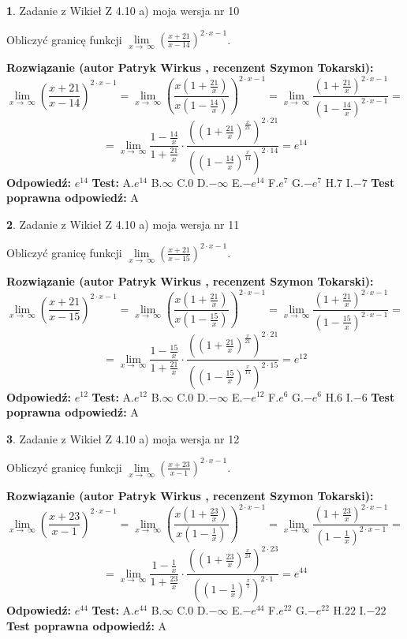\documentclass[12pt, a4paper]{article}
\theoremstyle{definition} %
\newtheorem{zad}{}
\newcommand{\zadStart}[1]{\begin{zad}#1\newline}
\newcommand{\zadStop}{\end{zad}}
\newcommand{\rozwStart}[2]{\noindent \textbf{Rozwiązanie (autor #1 , recenzent #2): }\newline}
\newcommand{\rozwStop}{\newline}
\newcommand{\odpStart}{\noindent \textbf{Odpowiedź:}\newline}
\newcommand{\odpStop}{\newline}
\newcommand{\testStart}{\noindent \textbf{Test:}\newline}
\newcommand{\testStop}{\newline}
\newcommand{\kluczStart}{\noindent \textbf{Test poprawna odpowiedź:}\newline}
\newcommand{\kluczStop}{\newline}
\begin{document}
\zadStart{Zadanie z Wikieł Z 4.10 a) moja wersja nr 10}

Obliczyć granicę funkcji  $\lim\limits_{x\to\ \infty}(\frac{x+21}{x-14})^{2\cdot x-1}$.
\zadStop
\rozwStart{Patryk Wirkus}{Szymon Tokarski}
$$\lim\limits_{x\to\ \infty}(\frac{x+21}{x-14})^{2\cdot x-1} = \lim\limits_{x\to\ \infty}(\frac{x(1+\frac{21}{x})}{x(1-\frac{14}{x})})^{2\cdot x-1}=\lim\limits_{x\to\ \infty}\frac{(1+\frac{21}{x})^{2\cdot x-1}}{(1-\frac{14}{x})^{2\cdot x-1}}=$$
$$=\lim\limits_{x\to\ \infty}\frac{1-\frac{14}{x}}{1+\frac{21}{x}}\cdot\frac{((1+\frac{21}{x})^{\frac{x}{21}})^{2\cdot21}}{((1-\frac{14}{x})^{\frac{x}{14}})^{2\cdot14}}=e^{14}$$
\rozwStop
\odpStart
$e^{14}$
\odpStop
\testStart
A.$e^{14}$ B.$\infty$ C.$0$ D.$-\infty$ E.$-e^{14}$
F.$e^{7}$ G.$-e^{7}$
H.$7$
I.$-7$
\testStop
\kluczStart
A
\kluczStop



\zadStart{Zadanie z Wikieł Z 4.10 a) moja wersja nr 11}

Obliczyć granicę funkcji  $\lim\limits_{x\to\ \infty}(\frac{x+21}{x-15})^{2\cdot x-1}$.
\zadStop
\rozwStart{Patryk Wirkus}{Szymon Tokarski}
$$\lim\limits_{x\to\ \infty}(\frac{x+21}{x-15})^{2\cdot x-1} = \lim\limits_{x\to\ \infty}(\frac{x(1+\frac{21}{x})}{x(1-\frac{15}{x})})^{2\cdot x-1}=\lim\limits_{x\to\ \infty}\frac{(1+\frac{21}{x})^{2\cdot x-1}}{(1-\frac{15}{x})^{2\cdot x-1}}=$$
$$=\lim\limits_{x\to\ \infty}\frac{1-\frac{15}{x}}{1+\frac{21}{x}}\cdot\frac{((1+\frac{21}{x})^{\frac{x}{21}})^{2\cdot21}}{((1-\frac{15}{x})^{\frac{x}{15}})^{2\cdot15}}=e^{12}$$
\rozwStop
\odpStart
$e^{12}$
\odpStop
\testStart
A.$e^{12}$ B.$\infty$ C.$0$ D.$-\infty$ E.$-e^{12}$
F.$e^{6}$ G.$-e^{6}$
H.$6$
I.$-6$
\testStop
\kluczStart
A
\kluczStop



\zadStart{Zadanie z Wikieł Z 4.10 a) moja wersja nr 12}

Obliczyć granicę funkcji  $\lim\limits_{x\to\ \infty}(\frac{x+23}{x-1})^{2\cdot x-1}$.
\zadStop
\rozwStart{Patryk Wirkus}{Szymon Tokarski}
$$\lim\limits_{x\to\ \infty}(\frac{x+23}{x-1})^{2\cdot x-1} = \lim\limits_{x\to\ \infty}(\frac{x(1+\frac{23}{x})}{x(1-\frac{1}{x})})^{2\cdot x-1}=\lim\limits_{x\to\ \infty}\frac{(1+\frac{23}{x})^{2\cdot x-1}}{(1-\frac{1}{x})^{2\cdot x-1}}=$$
$$=\lim\limits_{x\to\ \infty}\frac{1-\frac{1}{x}}{1+\frac{23}{x}}\cdot\frac{((1+\frac{23}{x})^{\frac{x}{23}})^{2\cdot23}}{((1-\frac{1}{x})^{\frac{x}{1}})^{2\cdot1}}=e^{44}$$
\rozwStop
\odpStart
$e^{44}$
\odpStop
\testStart
A.$e^{44}$ B.$\infty$ C.$0$ D.$-\infty$ E.$-e^{44}$
F.$e^{22}$ G.$-e^{22}$
H.$22$
I.$-22$
\testStop
\kluczStart
A
\kluczStop
\end{document}
